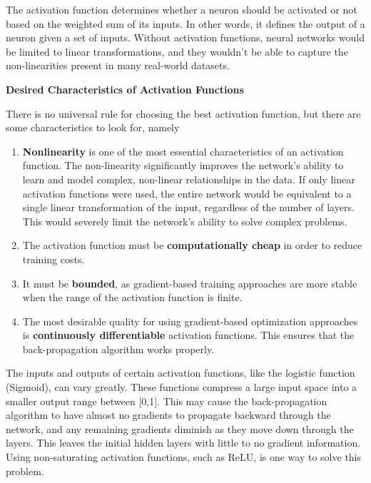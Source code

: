 \documentclass{article}
\begin{document}
The activation function determines whether a neuron should be activated or not based on the weighted sum of its inputs. In other words, it defines the output of a neuron given a set of inputs. Without activation functions, neural networks would be limited to linear transformations, and they wouldn't be able to capture the non-linearities present in many real-world datasets. 

\vspace{5mm}
\noindent \textbf{Desired Characteristics of Activation Functions} \citep{jagtap2022important}

\noindent There is no universal rule for choosing the best activation function, but there are some characteristics to look for, namely
\begin{enumerate}
  \item \textbf{Nonlinearity} is one of the most essential characteristics
of an activation function. The non-linearity significantly improves the network's ability to learn and model complex, non-linear relationships in the data. If only linear activation functions were used, the entire network would be equivalent to a single linear transformation of the input, regardless of the number of layers. This would severely limit the network's ability to solve complex problems.

  \item The activation function must
  be \textbf{computationally cheap} in order to reduce training costs.
  \item It must be \textbf{bounded}, as gradient-based training approaches are more stable when the range of the activation function is finite. 
\item The most desirable quality for using
gradient-based optimization approaches is \textbf{continuously
  differentiable} activation functions. This ensures that the
back-propagation algorithm works properly. 
\end{enumerate}
\begin{remark} The inputs and outputs of certain activation functions, like the logistic function (Sigmoid), can vary greatly. These functions compress a large input space into a smaller output range between [0,1]. This may cause the back-propagation algorithm to have almost no gradients to propagate backward through the network, and any remaining gradients diminish as they move down through the layers. This leaves the initial hidden layers with little to no gradient information. Using non-saturating activation functions, such as ReLU, is one way to solve this problem. 
\end{remark}
\end{document}
